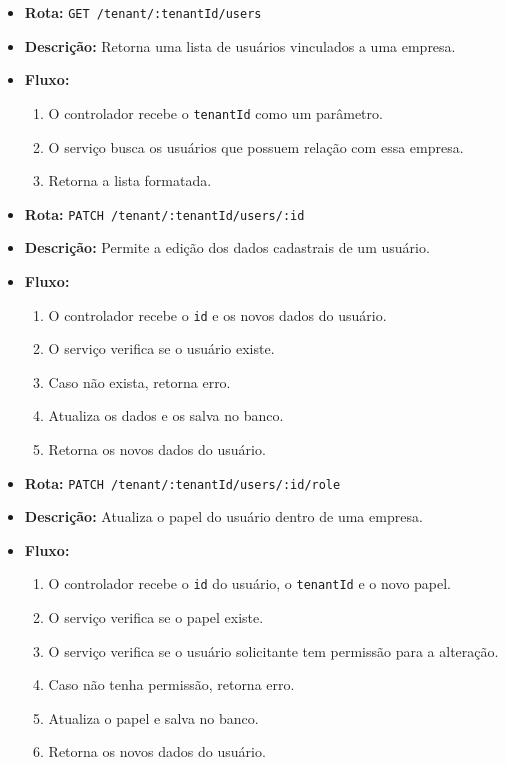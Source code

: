 \begin{itemize}
	\item \textbf{Rota:} \texttt{GET /tenant/:tenantId/users}
	\item \textbf{Descrição:} Retorna uma lista de usuários vinculados a uma empresa.
	\item \textbf{Fluxo:}
	\begin{enumerate}
		\item O controlador recebe o \texttt{tenantId} como um parâmetro.
		\item O serviço busca os usuários que possuem relação com essa empresa.
		\item Retorna a lista formatada.
	\end{enumerate}
\end{itemize}

\begin{itemize}
  \item \textbf{Rota:} \texttt{PATCH /tenant/:tenantId/users/:id}
  \item \textbf{Descrição:} Permite a edição dos dados cadastrais de um usuário.
  \item \textbf{Fluxo:}
  \begin{enumerate}
    \item O controlador recebe o \texttt{id} e os novos dados do usuário.
    \item O serviço verifica se o usuário existe.
    \item Caso não exista, retorna erro.
    \item Atualiza os dados e os salva no banco.
    \item Retorna os novos dados do usuário.
  \end{enumerate}
\end{itemize}

\begin{itemize}
  \item \textbf{Rota:} \texttt{PATCH /tenant/:tenantId/users/:id/role}
  \item \textbf{Descrição:} Atualiza o papel do usuário dentro de uma empresa.
  \item \textbf{Fluxo:}
  \begin{enumerate}
    \item O controlador recebe o \texttt{id} do usuário, o \texttt{tenantId} e o novo papel.
    \item O serviço verifica se o papel existe.
    \item O serviço verifica se o usuário solicitante tem permissão para a alteração.
    \item Caso não tenha permissão, retorna erro.
    \item Atualiza o papel e salva no banco.
    \item Retorna os novos dados do usuário.
  \end{enumerate}
\end{itemize}

